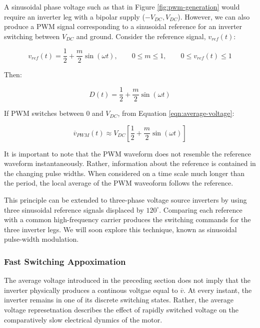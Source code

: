 \documentclass{article}
\begin{document}
A sinusoidal phase voltage such as that in Figure \ref{fig:pwm-generation} would require an inverter leg with a bipolar supply ($-V_{DC}, V_{DC}$). However, we can also produce a PWM signal corresponding to a sinusoidal reference for an inverter switching between $V_{DC}$ and ground. Consider the reference signal, $v_{ref}(t)$:

\begin{equation}
    v_{ref}(t) = \frac{1}{2} + \frac{m}{2}\sin(\omega t), \qquad
    0 \leq m \leq 1, \qquad
    0 \leq v_{ref}(t) \leq 1
\end{equation}

Then:

\begin{equation}
    D(t) = \frac{1}{2} + \frac{m}{2}\sin(\omega t)
\end{equation}

If PWM switches between $0$ and $V_{DC}$, from Equation \ref{eqn:average-voltage}:

\begin{equation}
    \overline{v}_{PWM}(t) \approx V_{DC} \left[ \frac{1}{2} + \frac{m}{2}\sin(\omega t) \right]
\end{equation}

It is important to note that the PWM waveform does not resemble the reference waveform instantaneously. Rather, information about the reference is contained in the changing pulse widths. When considered on a time scale much longer than the period, the local average of the PWM waveoform follows the reference.

This principle can be extended to three-phase voltage source inverters by using three sinusoidal reference signals displaced by $120^\circ$. Comparing each reference with a common high-frequency carrier produces the switching commands for the three inverter legs. We will soon explore this technique, known as sinusoidal pulse-width modulation.


\subsubsection{Fast Switching Appoximation}

The average voltage introduced in the preceding section does not imply that the inverter physically produces a continous voltgae equal to $\overline{v}$. At every instant, the inverter remains in one of its discrete switching states. Rather, the average voltage represetnation describes the effect of rapidly switched voltage on the comparatively slow electrical dynmics of the motor.
\end{document}
